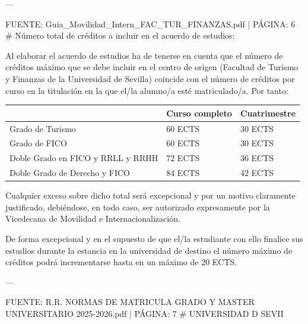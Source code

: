 \documentclass{article}
\begin{document}
\begin{itemize}
\begin{itemize}
\begin{scriptsize}
                  ---

                  FUENTE: Guia\_Movilidad\_Intern\_FAC\_TUR\_FINANZAS.pdf | PÁGINA: 6
                  \# Número total de créditos a incluir en el acuerdo de estudios:

                  Al elaborar el acuerdo de estudios ha de tenerse en cuenta que el número de créditos máximo que se debe incluir en el centro de origen (Facultad de Turismo y Finanzas de la Universidad de Sevilla) coincide con el número de créditos por curso en la titulación en la que el/la alumno/a esté matriculado/a. Por tanto:

                  \vspace{0.4cm}
                  \begin{table}[h!]\centering\renewcommand{\arraystretch}{1.3}
                    \begin{tabular}{|p{}|p{}|p{}|}\hline
                                                        & Curso completo & Cuatrimestre \\\hline
                      Grado de Turismo                  & 60 ECTS        & 30 ECTS      \\\hline
                      Grado de FICO                     & 60 ECTS        & 30 ECTS      \\\hline
                      Doble Grado en FICO y RRLL y RRHH & 72 ECTS        & 36 ECTS      \\\hline
                      Doble Grado de Derecho y FICO     & 84 ECTS        & 42 ECTS      \\\hline
                    \end{tabular}\end{table}
                  \vspace{0.4cm}

                  Cualquier exceso sobre dicho total será excepcional y por un motivo claramente justificado, debiéndose, en todo caso, ser autorizado expresamente por la Vicedecana de Movilidad e Internacionalización.

                  De forma excepcional y en el supuesto de que el/la estudiante con ello finalice sus estudios durante la estancia en la universidad de destino el número máximo de créditos podrá incrementarse hasta en un máximo de 20 ECTS.

                  ---

                  FUENTE: R.R. NORMAS DE MATRICULA GRADO Y MASTER UNIVERSITARIO 2025-2026.pdf | PÁGINA: 7
                  \# UNIVERSIDAD D SEVII


\end{scriptsize}
\end{itemize}
\end{itemize}
\end{document}
